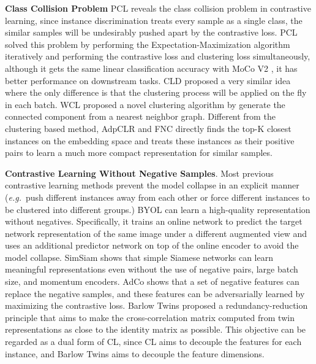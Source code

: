 \documentclass{article}
\newcommand{\<}{\left\langle}
\renewcommand{\>}{\right\rangle}
\newcommand{\eg}{{\emph{e.g.}}}
\begin{document}
\textbf{Class Collision Problem} PCL \cite{PCL} reveals the class collision problem in contrastive learning, since instance discrimination treats every sample as a single class, the similar samples will be undesirably pushed apart by the contrastive loss. PCL solved this problem by performing the Expectation-Maximization algorithm iteratively and performing the contrastive loss and clustering loss simultaneously, although it gets the same linear classification accuracy with MoCo V2 \cite{mocov2}, it has better performance on downstream tasks. CLD \cite{cld} proposed a very similar idea where the only difference is that the clustering process will be applied on the fly in each batch. WCL \cite{WCL} proposed a novel clustering algorithm by generate the connected component from a nearest neighbor graph. Different from the clustering based method, AdpCLR \cite{topk} and FNC \cite{FNCancel} directly finds the top-K closest instances on the embedding space and treats these instances as their positive pairs to learn a much more compact representation for similar samples.


\textbf{Contrastive Learning Without Negative Samples}. 
Most previous contrastive learning methods prevent the model collapse in an explicit manner (\eg~push different instances away from each other or force different instances to be clustered into different groups.) BYOL \cite{byol} can learn a high-quality representation without negatives. Specifically, it trains an online network to predict the target network representation of the same image under a different augmented view and uses an additional predictor network on top of the online encoder to avoid the model collapse. SimSiam \cite{SimSiam} shows that simple Siamese networks can learn meaningful representations even without the use of negative pairs, large batch size, and momentum encoders. AdCo \cite{adco} shows that a set of negative features can replace the negative samples, and these features can be adversarially learned by maximizing the contrastive loss. Barlow Twins \cite{barlowtwins} proposed a  redundancy-reduction principle that aims to make the cross-correlation matrix computed from twin representations as close to the identity matrix as possible. This objective can be regarded as a dual form of CL, since CL aims to decouple the features for each instance, and Barlow Twins aims to decouple the feature dimensions.
\end{document}
